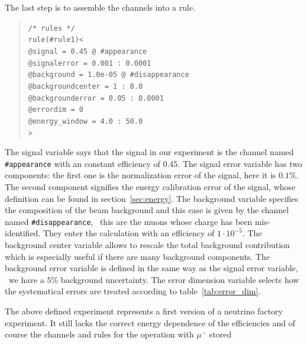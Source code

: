 The last step is to assemble the channels into a rule.
\begin{quote}
{\tt /* rules */}\\
{\tt rule(\#rule1)<}\\
{\tt \hspace*{3ex}@signal = 0.45 @ \#appearance}\\
{\tt \hspace*{3ex}@signalerror = 0.001 : 0.0001}\\
{\tt \hspace*{3ex}@background = 1.0e-05 @ \#disappearance}\\
{\tt \hspace*{3ex}@backgroundcenter = 1 : 0.0}\\
{\tt \hspace*{3ex}@backgrounderror = 0.05 : 0.0001}\\
{\tt \hspace*{3ex}@errordim = 0}\\
{\tt \hspace*{3ex}@energy\_window = 4.0 : 50.0}\\
{\tt >}
\end{quote}
The signal variable says that the signal in our experiment is the 
channel named {\tt \#appearance} with an constant efficiency of $0.45$.
The signal error variable has two components: the first one is the
normalization error of the signal, here it is $0.1\%$. The second component
signifies the energy calibration error of the signal, whose definition 
can be found in section~\ref{sec:energy}. The background variable
specifies the composition of the beam background and this case is
given by the channel named {\tt \#disappearance}, \ie\ this are
the muons whose charge has been mis-identified. They enter the calculation
with an efficiency of $1\cdot 10^{-5}$. The background center variable allows
to rescale the total background contribution which is especially useful if
there are many background components. 
The background error variable is defined in the same way as the signal error
variable, \ie\ we have a $5\%$ background uncertainty.
The error dimension variable selects how
the systematical errors are treated according to table~\ref{tab:error_dim}. 


The above defined experiment represents a first version of a neutrino factory
experiment. It still lacks the correct energy dependence of the efficiencies
and of course the channels and rules for the operation with $\mu^-$ stored

